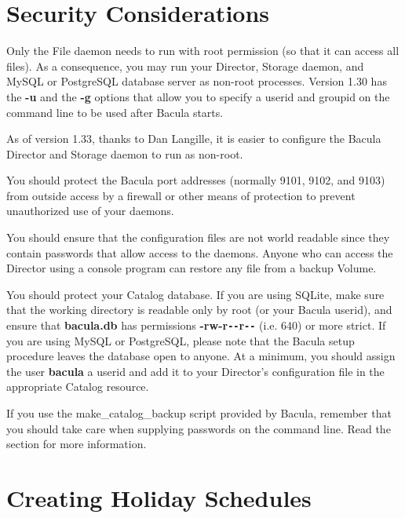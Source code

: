\section{Security Considerations}
\label{security}

Only the File daemon needs to run with root permission (so that it can access
all files). As a consequence, you may run your Director, Storage daemon, and
MySQL or PostgreSQL database server as non-root processes. Version 1.30 has
the {\bf -u} and the {\bf -g} options that allow you to specify a userid and
groupid on the command line to be used after Bacula starts.

As of version 1.33, thanks to Dan Langille, it is easier to configure the
Bacula Director and Storage daemon to run as non-root.

You should protect the Bacula port addresses (normally 9101, 9102, and 9103)
from outside access by a firewall or other means of protection to prevent
unauthorized use of your daemons.

You should ensure that the configuration files are not world readable since
they contain passwords that allow access to the daemons. Anyone who can access
the Director using a console program can restore any file from a backup
Volume.

You should protect your Catalog database. If you are using SQLite, make sure
that the working directory is readable only by root (or your Bacula userid),
and ensure that {\bf bacula.db} has permissions {\bf -rw-r\verb:--:r\verb:--:} (i.e. 640) or
more strict. If you are using MySQL or PostgreSQL, please note that the Bacula
setup procedure leaves the database open to anyone. At a minimum, you should
assign the user {\bf bacula} a userid and add it to your Director's
configuration file in the appropriate Catalog resource.

If you use the make\_catalog\_backup script provided by Bacula, remember that
you should take care when supplying passwords on the command line.  Read the
section for more information.

\section{Creating Holiday Schedules}
\label{holiday}

